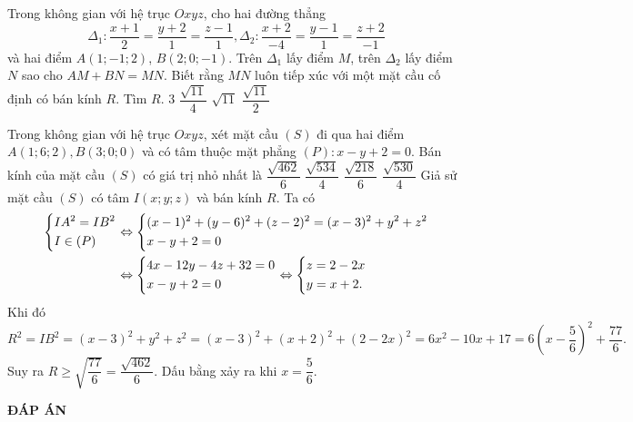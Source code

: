 \begin{ex}%
Trong không gian với hệ trục $Oxyz$, cho hai đường thẳng
$$\Delta_1: \dfrac{x+1}{2}=\dfrac{y+2}{1}=\dfrac{z-1}{1},\Delta_2: \dfrac{x+2}{-4}=\dfrac{y-1}{1}=\dfrac{z+2}{-1}$$
và hai điểm $A(1; -1; 2)$, $B(2; 0; -1)$. Trên $\Delta_1$ lấy điểm $M$, trên $\Delta_2$ lấy điểm $N$ sao cho $AM+BN=MN$. Biết rằng $MN$ luôn tiếp xúc với một mặt cầu cố định có bán kính $R$. Tìm $R$.
\choice
{$3$}
{$\dfrac{\sqrt{11}}{4}$}
{ $\sqrt{11}$}
{\True $\dfrac{\sqrt{11}}{2}$}
\end{ex}
\begin{ex}%
Trong không gian với hệ trục $Oxyz$, xét mặt cầu $(S)$ đi qua hai điểm $A(1; 6; 2),B(3; 0; 0)$ và có tâm thuộc mặt phẳng $(P): x-y+2=0$. Bán kính của mặt cầu $(S)$ có giá trị nhỏ nhất là
\choice
{\True $\dfrac{\sqrt{462}}{6}$}
{$\dfrac{\sqrt{534}}{4}$}
{ $\dfrac{\sqrt{218}}{6}$}
{$\dfrac{\sqrt{530}}{4}$}
\loigiai
{
Giả sử mặt cầu $(S)$ có tâm $I(x; y; z)$ và bán kính $R$. Ta có
$$\begin{aligned}\left\{\begin{aligned}&IA^2=IB^2\\&I\in (P)\end{aligned}\right.&\Leftrightarrow \left\{\begin{aligned}&(x-1)^2+(y-6)^2+(z-2)^2=(x-3)^2+y^2+z^2\\&x-y+2=0\end{aligned}\right.\\
&\Leftrightarrow\left\{\begin{aligned}&4x-12y-4z+32=0\\&x-y+2=0\end{aligned}\right.\Leftrightarrow\left\{\begin{aligned}&z=2-2x\\&y=x+2.\end{aligned}\right.
\end{aligned}$$
Khi đó
$$R^2=IB^2=(x-3)^2+y^2+z^2=(x-3)^2+(x+2)^2+(2-2x)^2=6x^2-10x+17=6\left(x-\dfrac{5}{6}\right)^2+\dfrac{77}{6}.$$
Suy ra $R\geq \sqrt{\dfrac{77}{6}}=\dfrac{\sqrt{462}}{6}$. Dấu bằng xảy ra khi $x=\dfrac{5}{6}$.	
}
\end{ex}

\newpage
\begin{center}
	\textbf{ĐÁP ÁN}
\end{center}
\begin{multicols}{10}
	 
\end{multicols}